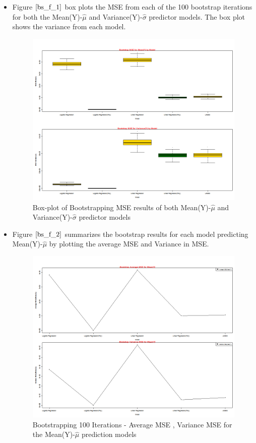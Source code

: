 \documentclass[twoside,12pt]{article}
\begin{document}
\begin{itemize}
\item
Figure $\eqref{bs_f_1}$ box plots the MSE from each of the 100 bootstrap iterations for both the Mean(Y)-$\hat{\mu}$ and Variance(Y)-$\hat{\sigma}$ predictor models. The box plot shows the variance from each model.
\FloatBarrier
\begin{figure}[!htbp]
	\centering
	\includegraphics[scale=.50]{images/mt_boxplot_bootstrap_muhat_results.png} 
	\caption{Box-plot of Bootstrapping MSE results of both  Mean(Y)-$\hat{\mu}$ and  Variance(Y)-$\hat{\sigma}$ predictor models}
	\label{bs_f_1}
\end{figure}


\FloatBarrier
\item
Figure $\eqref{bs_f_2}$ summarizes the bootstrap results for each model predicting  Mean(Y)-$\hat{\mu}$ by plotting the average MSE and Variance in MSE. 
\begin{figure}[!htbp]
\centering
\includegraphics[scale=.50]{images/mt_bootstrap_muhat_mse_var_plot.png} 
\caption{Bootstrapping 100 Iterations - Average MSE , Variance MSE for the  Mean(Y)-$\hat{\mu}$ prediction models}
\label{bs_f_2}
\end{figure}



\end{itemize}
\end{document}
